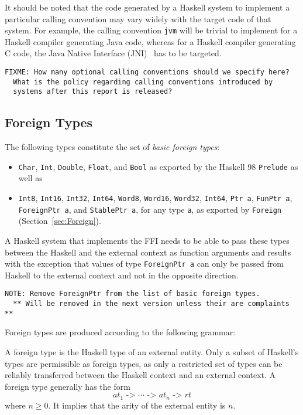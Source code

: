 \documentclass[a4paper,twosides]{article}
\newcommand{\code}[1]{\texttt{#1}}      %
\begin{document}
It should be noted that the code generated by a Haskell system to implement a
particular calling convention may vary widely with the target code of that
system.  For example, the calling convention \code{jvm} will be trivial to
implement for a Haskell compiler generating Java code, whereas for a Haskell
compiler generating C code, the Java Native Interface (JNI)~\cite{liang:JNI}
has to be targeted.

\begin{verbatim}
FIXME: How many optional calling conventions should we specify here?
  What is the policy regarding calling conventions introduced by
  systems after this report is released?
\end{verbatim}

\subsection{Foreign Types}
\label{sec:foreign-types}

The following types constitute the set of \emph{basic foreign types}:
%
\begin{itemize}
\item \code{Char}, \code{Int}, \code{Double}, \code{Float}, and \code{Bool} as
  exported by the Haskell 98 \code{Prelude} as well as
\item \code{Int8}, \code{Int16}, \code{Int32}, \code{Int64}, \code{Word8},
  \code{Word16}, \code{Word32}, \code{Int64}, \code{Ptr a}, \code{FunPtr a},
  \code{ForeignPtr a}, and \code{StablePtr a}, for any type \code{a}, as
  exported by \code{Foreign} (Section~\ref{sec:Foreign}).
\end{itemize}
%
A Haskell system that implements the FFI needs to be able to pass these types
between the Haskell and the external context as function arguments and results
with the exception that values of type \code{ForeignPtr a} can only be passed
from Haskell to the external context and not in the opposite direction.

\begin{verbatim}
NOTE: Remove ForeignPtr from the list of basic foreign types.
  ** Will be removed in the next version unless their are complaints **
\end{verbatim}

Foreign types are produced according to the following grammar:
%
\begin{grammar}
  \gor{%
    ()}
\end{grammar}
%
A foreign type is the Haskell type of an external entity.  Only a subset of
Haskell's types are permissible as foreign types, as only a restricted set of
types can be reliably transferred between the Haskell context and an external
context.  A foreign type generally has the form
\[
\textit{at}_1\code{ -> }\cdots\code{ -> }\textit{at}_n\code{ -> }\textit{rt}
\]
where \(n\geq0\).  It implies that the arity of the external entity is $n$.
\end{document}
